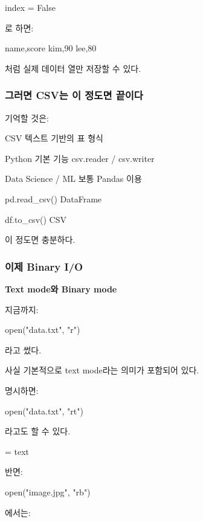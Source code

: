 \begin{dhkzsh}
index = False
\end{dhkzsh}

로 하면:

\begin{dhkzsh}
name,score
kim,90
lee,80
\end{dhkzsh}

처럼 실제 데이터 열만 저장할 수 있다.

\subsubsection{그러면 CSV는 이 정도면 끝이다}

기억할 것은:

\begin{dhksmry}[centered]
CSV
\da
텍스트 기반의 표 형식


Python 기본 기능
\da
csv.reader / csv.writer


Data Science / ML
\da
보통 Pandas 이용


pd.read_csv()
\da
DataFrame


df.to_csv()
\da
CSV
\end{dhksmry}

이 정도면 충분하다.

\subsubsection{이제 Binary I/O}

\textbf{Text mode와 Binary mode}

지금까지:

\begin{dhkcode}
open("data.txt", "r")
\end{dhkcode}

라고 썼다.

사실 기본적으로 text mode라는 의미가 포함되어 있다.

명시하면:

\begin{dhkcode}
open("data.txt", "rt")
\end{dhkcode}

라고도 할 수 있다.

 = text

반면:

\begin{dhkcode}
open("image.jpg", "rb")
\end{dhkcode}

에서는:

